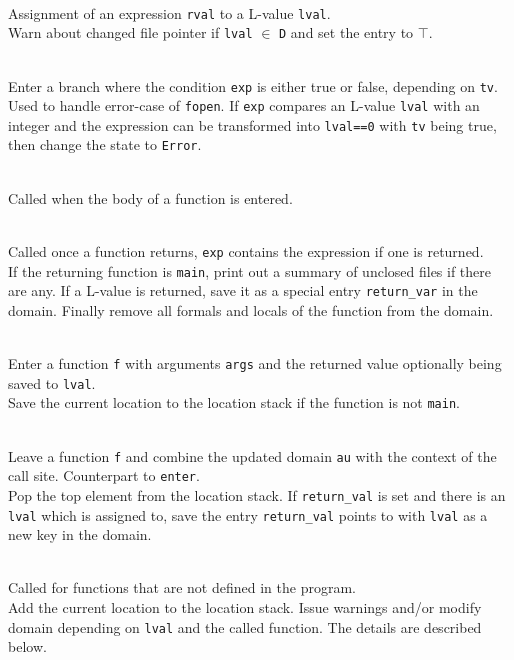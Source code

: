 \begin{description}
\item {}\\
Assignment of an expression \verb|rval| to a L-value \verb|lval|.\\
Warn about changed file pointer if \verb|lval| $\in$ \verb|D| and set the entry to $\top$.

\item {}\\
Enter a branch where the condition \verb|exp| is either true or false, depending on \verb|tv|.\\
Used to handle error-case of \verb|fopen|. If \verb|exp| compares an L-value \verb|lval| with an integer and the expression can be transformed into \verb|lval==0| with \verb|tv| being true, then change the state to \verb|Error|.

\item {}\\
Called when the body of a function is entered.

\item {}\\
Called once a function returns, \verb|exp| contains the expression if one is returned.\\
If the returning function is \verb|main|, print out a summary of unclosed files if there are any.
If a L-value is returned, save it as a special entry \verb|return_var| in the domain.
Finally remove all formals and locals of the function from the domain.

\item {}\\
Enter a function \verb|f| with arguments \verb|args| and the returned value optionally being saved to \verb|lval|.\\
Save the current location to the location stack if the function is not \verb|main|.

\item {}\\
Leave a function \verb|f| and combine the updated domain \verb|au| with the context of the call site. Counterpart to \verb|enter|.\\
Pop the top element from the location stack. If \verb|return_val| is set and there is an \verb|lval| which is assigned to, save the entry \verb|return_val| points to with \verb|lval| as a new key in the domain.


\item {}\\
Called for functions that are not defined in the program.\\
Add the current location to the location stack. Issue warnings and/or modify domain depending on \verb|lval| and the called function. The details are described below.
\end{description}



